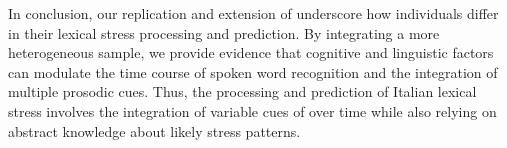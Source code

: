 In conclusion, our replication and extension of \cite{Sulpizio_McQueen_2012} underscore how individuals differ in their lexical stress processing and prediction. By integrating a more heterogeneous sample, we provide evidence that cognitive and linguistic factors can modulate the time course of spoken word recognition and the integration of multiple prosodic cues. Thus, the processing and prediction of Italian lexical stress involves the integration of variable cues of over time while also relying on abstract knowledge about likely stress patterns.

